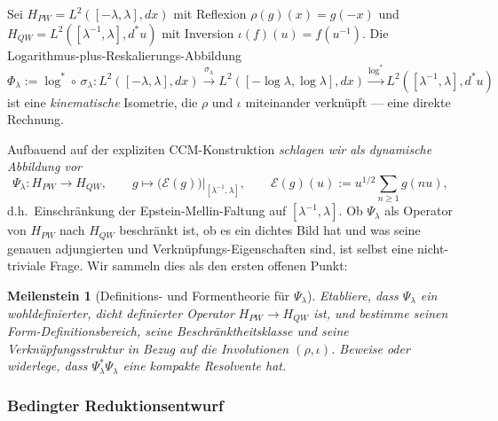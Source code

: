 \documentclass[11pt,a4paper]{article}
\theoremstyle{plain}
\newtheorem{milestone}[theorem]{Meilenstein}
\theoremstyle{definition}
\begin{document}
Sei $H_{PW} = L^2([-\lambda, \lambda], dx)$ mit Reflexion
$\rho(g)(x) = g(-x)$ und $H_{QW} = L^2([\lambda^{-1}, \lambda], d^\ast u)$
mit Inversion $\iota(f)(u) = f(u^{-1})$. Die Logarithmus-plus-Reskalierungs-Abbildung
\[
  \Phi_\lambda := \log^\ast \circ \, \sigma_\lambda :
    L^2([-\lambda, \lambda], dx) \xrightarrow{\sigma_\lambda}
    L^2([-\log\lambda, \log\lambda], dx)
    \xrightarrow{\log^\ast}
    L^2([\lambda^{-1}, \lambda], d^\ast u)
\]
ist eine \emph{kinematische} Isometrie, die $\rho$ und $\iota$ miteinander verknüpft ---
eine direkte Rechnung.

Aufbauend auf der expliziten CCM-Konstruktion \emph{schlagen wir als
dynamische Abbildung vor}
\[
  \Psi_\lambda : H_{PW} \longrightarrow H_{QW}, \qquad
    g \mapsto \big(\mathcal E(g)\big)\big|_{[\lambda^{-1},\lambda]},
  \qquad \mathcal E(g)(u) := u^{1/2} \sum_{n \ge 1} g(nu),
\]
d.h.\ Einschränkung der Epstein-Mellin-Faltung auf $[\lambda^{-1},\lambda]$.
Ob $\Psi_\lambda$ als Operator von $H_{PW}$ nach $H_{QW}$ beschränkt ist,
ob es ein dichtes Bild hat und was seine genauen adjungierten und
Verknüpfungs-Eigenschaften sind, ist selbst eine nicht-triviale Frage.
Wir sammeln dies als den ersten offenen Punkt:

\begin{milestone}[Definitions- und Formentheorie für $\Psi_\lambda$]
\label{ms:psi-domain}
Etabliere, dass $\Psi_\lambda$ ein wohldefinierter, dicht definierter
Operator $H_{PW} \to H_{QW}$ ist, und bestimme seinen Form-Definitionsbereich,
seine Beschränktheitsklasse und seine Verknüpfungsstruktur in Bezug auf
die Involutionen $(\rho, \iota)$. Beweise oder widerlege, dass
$\Psi_\lambda^\ast \Psi_\lambda$ eine kompakte Resolvente hat.
\end{milestone}

\subsubsection{Bedingter Reduktionsentwurf}
\end{document}
